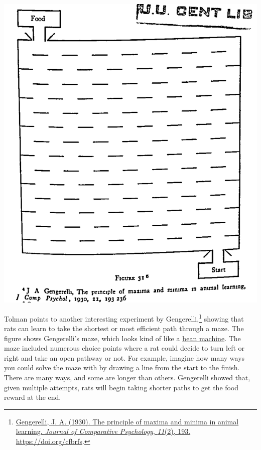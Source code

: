\documentclass[
  oneside,
  12pt]{crumpbook}
\newenvironment{floatrightbox50}{%
  \wrapfigure{R}{.5\textwidth}%
  }{%
  \endwrapfigure}
\begin{document}
\begin{floatrightbox50}
\includegraphics[width=1\linewidth]{imgs/Tolman_Minima}

\end{floatrightbox50}

Tolman points to another interesting experiment by Gengerelli,\footnote{\protect\hyperlink{ref-gengerelliPrincipleMaximaMinima1930}{Gengerelli, J. A. (1930). The principle of maxima and minima in animal learning. \emph{Journal of Comparative Psychology}, \emph{11}(2), 193. \url{https://doi.org/cfbrfs}}.} showing that rats can learn to take the shortest or most efficient path through a maze. The figure shows Gengerelli's maze, which looks kind of like a \href{https://en.wikipedia.org/wiki/Bean_machine}{bean machine}. The maze included numerous choice points where a rat could decide to turn left or right and take an open pathway or not. For example, imagine how many ways you could solve the maze with by drawing a line from the start to the finish. There are many ways, and some are longer than others. Gengerelli showed that, given multiple attempts, rats will begin taking shorter paths to get the food reward at the end.
\end{document}
